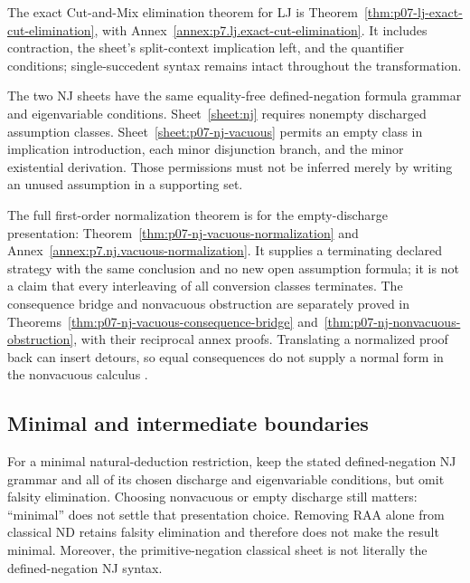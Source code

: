 The exact Cut-and-Mix elimination theorem for LJ is
Theorem~\ref{thm:p07-lj-exact-cut-elimination}, with
Annex~\ref{annex:p7.lj.exact-cut-elimination}.  It includes contraction,
the sheet's split-context implication left, and the quantifier conditions;
single-succedent syntax remains intact throughout the transformation.


The two NJ sheets have the same equality-free defined-negation formula
grammar and eigenvariable conditions.  Sheet~\ref{sheet:nj} requires
nonempty discharged assumption classes.
Sheet~\ref{sheet:p07-nj-vacuous} permits an empty class in implication
introduction, each minor disjunction branch, and the minor existential
derivation.  Those permissions must not be inferred merely by writing an
unused assumption in a supporting set.

The full first-order normalization theorem is for the empty-discharge
presentation: Theorem~\ref{thm:p07-nj-vacuous-normalization} and
Annex~\ref{annex:p7.nj.vacuous-normalization}.  It supplies a terminating
declared strategy with the same conclusion and no new open assumption
formula; it is not a claim that every interleaving of all conversion
classes terminates.  The consequence bridge and nonvacuous obstruction
are separately proved in
Theorems~\ref{thm:p07-nj-vacuous-consequence-bridge}
and~\ref{thm:p07-nj-nonvacuous-obstruction}, with their reciprocal annex
proofs.  Translating a normalized proof back can insert detours, so equal
consequences do not supply a normal form in the nonvacuous calculus
\cite{Prawitz1965,DeGroote2002NJPermutation,Read2014ProofTheoreticValidityManuscript}.


\subsection{Minimal and intermediate boundaries}

For a minimal natural-deduction restriction, keep the stated
defined-negation NJ grammar and all of its chosen discharge and
eigenvariable conditions, but omit falsity elimination.  Choosing
nonvacuous or empty discharge still matters: ``minimal'' does not settle
that presentation choice.  Removing RAA alone from classical ND retains
falsity elimination and therefore does not make the result minimal.
Moreover, the primitive-negation classical sheet is not literally the
defined-negation NJ syntax.

